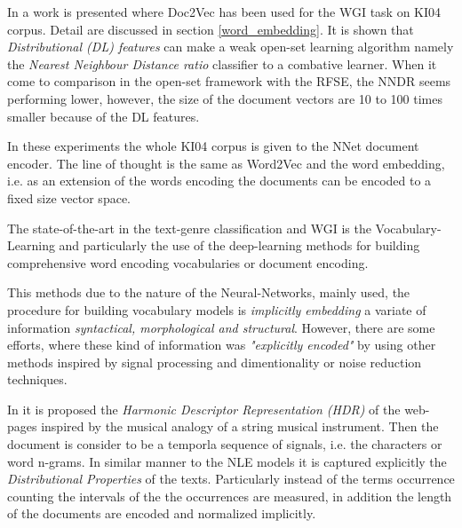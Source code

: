 In \parencite{pritsos2019open} a work is presented where Doc2Vec has been used for the WGI task on KI04 corpus. Detail are discussed in section \ref{word_embedding}. It is shown that \textit{Distributional (DL) features} can make a weak open-set learning algorithm namely the \textit{Nearest Neighbour Distance ratio} classifier to a combative learner. When it come to comparison in the open-set framework with the RFSE, the NNDR seems performing lower, however, the size of the document vectors are 10 to 100 times smaller because of the DL features. 

In these experiments the whole KI04 corpus is given to the NNet document encoder. The line of thought is the same as Word2Vec and the word embedding, i.e. as an extension of the words encoding the documents can be encoded to a fixed size vector space. 




The state-of-the-art in the text-genre classification and WGI is the Vocabulary-Learning and particularly the use of the deep-learning methods for building comprehensive word encoding vocabularies or document encoding. 

This methods due to the nature of the Neural-Networks, mainly used,  the procedure for building vocabulary models is \textit{implicitly embedding} a variate of information\textit{ syntactical, morphological and structural}. However, there are some efforts, where these kind of information was \textit{"explicitly encoded"} by using other methods inspired by signal processing and dimentionality or noise reduction techniques.


In \parencite{kim2010formulating} it is proposed the \textit{Harmonic Descriptor Representation (HDR)} of the web-pages inspired by the musical analogy of a string musical instrument. Then the document is consider to be a temporla sequence of signals, i.e. the characters or word n-grams. In similar manner to the NLE models it is captured explicitly the \textit{Distributional Properties} of the texts. Particularly instead of the terms occurrence counting the intervals of the the occurrences are measured, in addition the length of the documents are encoded and normalized implicitly. 


